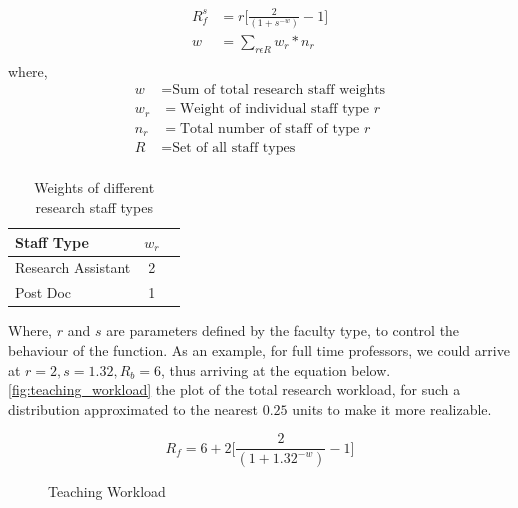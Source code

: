 \begin{equation}
    \begin{aligned}
        R^s_f & = r\bigg[\frac{2}{(1 + s^{-w} )}- 1\bigg] \\
        w     & = \sum_{r \epsilon R} w_r * n_r           \\
    \end{aligned}
\end{equation}
where,
\begin{equation}
    \nonumber
    \begin{aligned}
        w   & = \text{Sum of total research staff weights} \\
        w_r & = \text{Weight of individual staff type }r   \\
        n_r & = \text{Total number of staff of type }r     \\
        R   & = \text{Set of all staff types}              \\
    \end{aligned}
\end{equation}
\begin{table}[H]
    \centering
    \begin{tabular}{|l|c|c|}
        \hline
        Staff Type         & \(w_r\) \\
        \hline
        Research Assistant & 2       \\
        Post Doc           & 1       \\
        \hline
    \end{tabular}
    \caption{Weights of different research staff types}
\end{table}

Where, \(r\) and \(s\) are parameters defined by the faculty type, to control the behaviour of the function. As an example, for full time professors, we could arrive at \(r=2, s=1.32, R_b = 6 \), thus arriving at the equation below. \autoref{fig:teaching_workload} the plot of the total research workload, for such a distribution  approximated to the nearest \(0.25\) units to make it more realizable.

\[R_f = 6 + 2\bigg[\frac{2}{(1 + 1.32^{-w} )}- 1\bigg]\]

\begin{figure}[H]
    \centering
    \caption{Teaching Workload}
    \label{fig:teaching_workload}
\end{figure}
